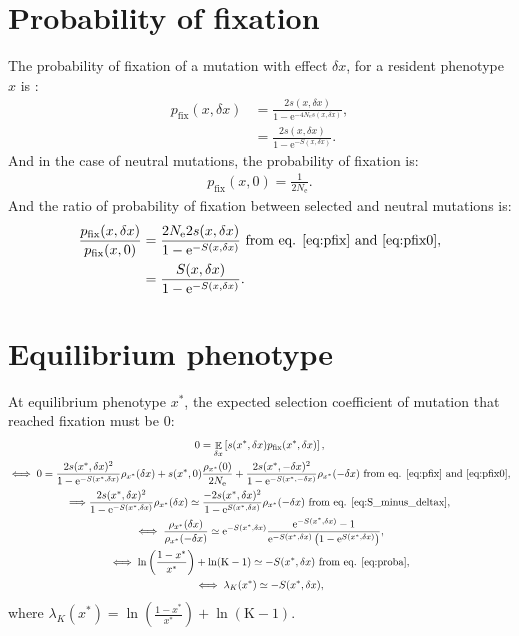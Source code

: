 \documentclass{article}
\DeclareMathOperator{\E}{\mathbb{E}}
\newcommand{\e}{\mathrm{e}}
\newcommand{\Ne}{N_{\mathrm{e}}}
\newcommand{\Nstate}{\text{K}}
\newcommand{\x}{x}
\newcommand{\eq}{^{*}}
\newcommand{\dx}{\delta \x}
\begin{document}
\section*{Probability of fixation}
The probability of fixation of a mutation with effect $\dx$, for a resident phenotype $\x$ is :
\begin{align}
p_{\text{fix}}(\x, \dx) &= \frac{ 2 s(\x, \dx)}{1 - \e^{-4\Ne s(\x, \dx)}}, \\
 &= \frac{ 2 s(\x, \dx)}{1 - \e^{-S(\x, \dx)}}. \label{eq:pfix}
\end{align}
And in the case of neutral mutations, the probability of fixation is:
\begin{gather}
p_{\text{fix}}(\x, 0) = \frac{ 1}{2 \Ne} \label{eq:pfix0}.
\end{gather}
And the ratio of probability of fixation between selected and neutral mutations is:
\begin{align}
\frac{p_{\text{fix}}(\x, \dx)}{p_{\text{fix}}(\x, 0)} & = \frac{ 2 \Ne 2 s(\x, \dx)}{1 - \e^{-S(\x, \dx)}} \text{ from eq. \ref{eq:pfix} and \ref{eq:pfix0}},\\
& = \frac{S(\x, \dx)}{1 - \e^{-S(\x, \dx)}} \label{eq:pfixratio}.
\end{align}
\section*{Equilibrium phenotype}
At equilibrium phenotype $\x\eq$, the expected selection coefficient of mutation that reached fixation must be $0$:
\begin{gather}
 0 = \E_{\dx} \left[ s(\x\eq, \dx) p_{\text{fix}}(\x\eq, \dx) \right], \\
\iff 0 = \frac{ 2 s(\x\eq, \dx)^2}{1 - \e^{-S(\x\eq, \dx)}}   \rho_{\x\eq}(\dx) + s(\x\eq, 0) \frac{ \rho_{\x\eq}(0)}{2\Ne} + \frac{ 2s(\x\eq, -\dx)^2}{1 - \e^{-S(\x\eq, -\dx)}} \rho_{\x\eq}(-\dx)\text{ from eq. \ref{eq:pfix} and \ref{eq:pfix0}}, \\
\Longrightarrow \frac{ 2s(\x\eq, \dx)^2}{1 - \e^{-S(\x\eq, \dx)}}   \rho_{\x\eq}(\dx) \simeq \frac{ - 2s(\x\eq, \dx)^2}{1 - \e^{S(\x\eq, \dx)}}   \rho_{\x\eq}(-\dx) \text{ from eq. \ref{eq:S_minus_deltax}}, \\
\iff \frac{ \rho_{\x\eq}(\dx)}{\rho_{\x\eq}(-\dx)} \simeq \e^{-S(\x\eq, \dx)} \frac{ \e^{-S(\x\eq, \dx)} - 1}{ \e^{-S(\x\eq, \dx)} \left( 1 - \e^{S(\x\eq, \dx)} \right)}, \\
\iff \ln \left( \frac{1 - \x\eq}{\x\eq} \right) + \ln (\Nstate-1) \simeq -S(\x\eq, \dx) \text{ from eq. \ref{eq:proba}} \label{eq:equilibrium}, \\
\iff \lambda_{K}(\x\eq) \simeq -S(\x\eq, \dx) \label{eq:equilibrium_lambda},
\end{gather}
where  $\lambda_{K}(\x\eq) = \ln \left( \frac{1 - \x\eq}{\x\eq} \right) + \ln (\Nstate-1)$.
\end{document}
